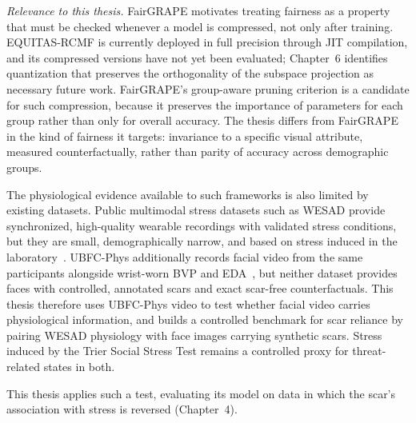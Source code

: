 \textit{Relevance to this thesis.} FairGRAPE motivates treating fairness as a property that must be checked whenever a model is compressed, not only after training. EQUITAS-RCMF is currently deployed in full precision through JIT compilation, and its compressed versions have not yet been evaluated; Chapter~6 identifies quantization that preserves the orthogonality of the subspace projection as necessary future work. FairGRAPE's group-aware pruning criterion is a candidate for such compression, because it preserves the importance of parameters for each group rather than only for overall accuracy. The thesis differs from FairGRAPE in the kind of fairness it targets: invariance to a specific visual attribute, measured counterfactually, rather than parity of accuracy across demographic groups.


The physiological evidence available to such frameworks is also limited by existing datasets. Public multimodal stress datasets such as WESAD provide synchronized, high-quality wearable recordings with validated stress conditions, but they are small, demographically narrow, and based on stress induced in the laboratory~\cite{schmidt2018}. UBFC-Phys additionally records facial video from the same participants alongside wrist-worn BVP and EDA~\cite{sabour2023}, but neither dataset provides faces with controlled, annotated scars and exact scar-free counterfactuals. This thesis therefore uses UBFC-Phys video to test whether facial video carries physiological information, and builds a controlled benchmark for scar reliance by pairing WESAD physiology with face images carrying synthetic scars. Stress induced by the Trier Social Stress Test remains a controlled proxy for threat-related states in both.


This thesis applies such a test, evaluating its model on data in which the scar's association with stress is reversed (Chapter~4).


